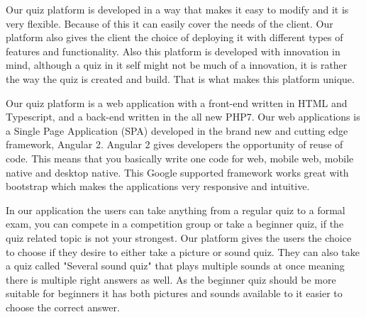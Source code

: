 \par
Our quiz platform is developed in a way that makes it easy to modify and it is very flexible. Because of this it can easily cover the needs of the client. Our platform also gives the client the choice of deploying it with different types of features and functionality. Also this platform is developed with innovation in mind, although a quiz in it self might not be much of a innovation, it is rather the way the quiz is created and build. That is what makes this platform unique.

Our quiz platform is a web application with a front-end written in HTML and Typescript, and a back-end written in the all new  PHP7. Our web applications is a Single Page Application (SPA) developed in the brand new and cutting edge framework, Angular 2\cite{Angular2:online}. Angular 2 gives developers the opportunity of reuse of code. This means that you basically write one code for web, mobile web, mobile native and desktop native. This Google supported framework works great with bootstrap which makes the applications very responsive and intuitive. 

In our application the users can take anything from a regular quiz to a formal exam, you can compete in a competition group or take a beginner quiz, if the quiz related topic is not your strongest. Our platform gives the users the choice to choose if they desire to either take a picture or sound quiz. They can also take a quiz called "Several sound quiz" that plays multiple sounds at once meaning there is multiple right answers as well. As the beginner quiz should be more suitable for beginners it has both pictures and sounds available to it easier to choose the correct answer.